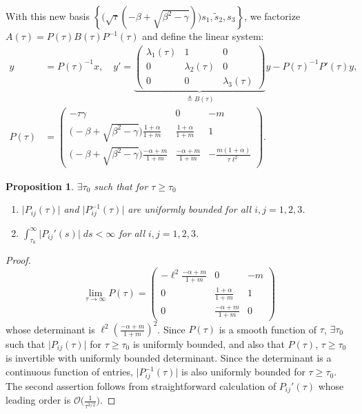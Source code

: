 \documentclass[a4paper,11pt]{article}
\def\l{{\ell}}
\newtheorem{proposition}{Proposition}[section]
\theoremstyle{remark}
\begin{document}
{With this new basis $\left\{\Big(\sqrt{\tau}(-\beta+\sqrt{\beta^2-\gamma})\Big)s_1,\tilde s_2, s_3 \right\}$, we factorize $A(\tau) = P(\tau)B(\tau)P^{-1}(\tau)$ and define the linear system:
\begin{equation}\label{eq:factor}
\begin{aligned}
 y &= P(\tau)^{-1} x, \quad  y' = \underbrace{\begin{pmatrix} \lambda_1(\tau) & 1 & 0\\0 & \lambda_2(\tau) & 0\\0 & 0 & \lambda_3(\tau)\end{pmatrix}}_{\triangleq B(\tau)} y - P(\tau)^{-1}P'(\tau) y,\\
 P(\tau) &= \begin{pmatrix} -\tau\gamma& 0 & -m\\ \Big(-\beta+\sqrt{\beta^2-\gamma}\Big)\frac{1+\alpha}{1+m} & \frac{1+\alpha}{1+m} & 1\\ \Big(-\beta+\sqrt{\beta^2-\gamma}\Big)\frac{-\alpha+m}{1+m} & \frac{-\alpha+m}{1+m} & -\frac{m(1+\alpha)}{\tau\l^2}\end{pmatrix}.
\end{aligned}
\end{equation}
\begin{proposition} \label{prop:factor}$\exists \tau_0$ such that for $\tau\ge\tau_0$
 \begin{enumerate}
  \item  $\big|P_{ij}(\tau)\big|$ and $\big|P^{-1}_{ij}(\tau)\big|$ are uniformly bounded for all $i,j=1,2,3$.
  \item $\displaystyle \int_{\tau_0}^\infty \big|P_{ij}'(s)\big|\; ds < \infty$ for all $i,j=1,2,3$.
 \end{enumerate}
\end{proposition}
\begin{proof}
$$ \lim_{\tau \rightarrow \infty} P(\tau) = \begin{pmatrix} -\l^2\frac{-\alpha+m}{1+m}& 0 & -m\\ 0 & \frac{1+\alpha}{1+m} & 1\\ 0 & \frac{-\alpha+m}{1+m} & 0\end{pmatrix}$$
whose determinant is $\l^2 \left(\frac{-\alpha+m}{1+m}\right)^2$. Since $P(\tau)$ is a smooth function of $\tau$, $\exists \tau_0$ such that $\big|P_{ij}(\tau)\big|$ for $\tau\ge\tau_0$ is uniformly bounded, and also that $P(\tau)$, $\tau\ge\tau_0$ is invertible with uniformly bounded determinant. Since the determinant is a continuous function of entries, $\big|P^{-1}_{ij}(\tau)\big|$ is also uniformly bounded for $\tau\ge \tau_0$. The second assertion follows from straightforward calculation of $P_{ij}'(\tau)$ whose leading order is $\mathcal{O}\big(\frac{1}{\tau^{3/2}}\big)$.
\end{proof}
}
\end{document}
